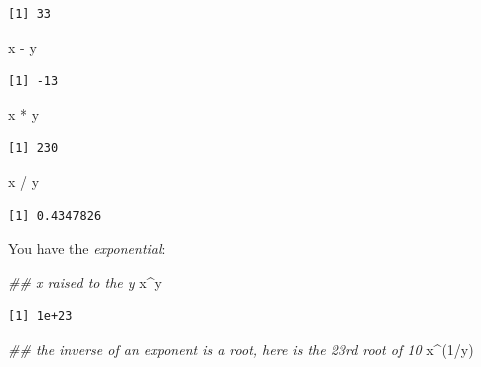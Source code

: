 \documentclass[
  letterpaper,
]{book}
\newenvironment{Shaded}{\begin{snugshade}}{\end{snugshade}}
\newcommand{\DecValTok}[1]{\textcolor[rgb]{0.68,0.00,0.00}{#1}}
\newcommand{\DocumentationTok}[1]{\textcolor[rgb]{0.37,0.37,0.37}{\textit{#1}}}
\newcommand{\NormalTok}[1]{\textcolor[rgb]{0.00,0.23,0.31}{#1}}
\newcommand{\SpecialCharTok}[1]{\textcolor[rgb]{0.37,0.37,0.37}{#1}}
\begin{document}
\begin{verbatim}
[1] 33
\end{verbatim}

\begin{Shaded}
\begin{Highlighting}[]
\NormalTok{x }\SpecialCharTok{{-}}\NormalTok{ y}
\end{Highlighting}
\end{Shaded}

\begin{verbatim}
[1] -13
\end{verbatim}

\begin{Shaded}
\begin{Highlighting}[]
\NormalTok{x }\SpecialCharTok{*}\NormalTok{ y}
\end{Highlighting}
\end{Shaded}

\begin{verbatim}
[1] 230
\end{verbatim}

\begin{Shaded}
\begin{Highlighting}[]
\NormalTok{x }\SpecialCharTok{/}\NormalTok{ y}
\end{Highlighting}
\end{Shaded}

\begin{verbatim}
[1] 0.4347826
\end{verbatim}

You have the \emph{exponential}:

\begin{Shaded}
\begin{Highlighting}[]
\DocumentationTok{\#\# x raised to the y}
\NormalTok{x}\SpecialCharTok{\^{}}\NormalTok{y}
\end{Highlighting}
\end{Shaded}

\begin{verbatim}
[1] 1e+23
\end{verbatim}

\begin{Shaded}
\begin{Highlighting}[]
\DocumentationTok{\#\# the inverse of an exponent is a root, here is the 23rd root of 10}
\NormalTok{x}\SpecialCharTok{\^{}}\NormalTok{(}\DecValTok{1}\SpecialCharTok{/}\NormalTok{y)}
\end{Highlighting}
\end{Shaded}
\end{document}

